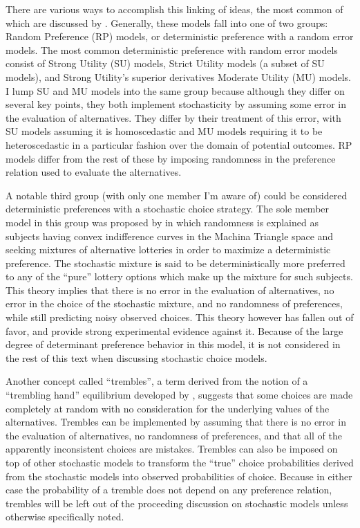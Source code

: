 \documentclass[../main.tex]{subfiles}
\begin{document}
There are various ways to accomplish this linking of ideas, the most common of which are discussed by \textcite{Wilcox2008}.
Generally, these models fall into one of two groups: Random Preference (RP) models, or deterministic preference with a random error models.
The most common deterministic preference with random error models consist of Strong Utility (SU) models, Strict Utility models (a subset of SU models), and Strong Utility's superior derivatives Moderate Utility (MU) models.
I lump SU and MU models into the same group because although they differ on several key points, they both implement stochasticity by assuming some error in the evaluation of alternatives.
They differ by their treatment of this error, with SU models assuming it is homoscedastic and MU models requiring it to be heteroscedastic in a particular fashion over the domain of potential outcomes.
RP models differ from the rest of these by imposing randomness in the preference relation used to evaluate the alternatives.

A notable third group (with only one member I'm aware of) could be considered deterministic preferences with a stochastic choice strategy.
The sole member model in this group was proposed by \textcite{Machina1985} in which randomness is explained as subjects having convex indifference curves in the Machina Triangle space \textcite{Machina1987} and seeking mixtures of alternative lotteries in order to maximize a deterministic preference.
The stochastic mixture is said to be deterministically more preferred to any of the \enquote{pure} lottery options which make up the mixture for such subjects.
This theory implies that there is no error in the evaluation of alternatives, no error in the choice of the stochastic mixture, and no randomness of preferences, while still predicting noisy observed choices.
This theory however has fallen out of favor, and \textcite{Hey1995} provide strong experimental evidence against it.
Because of the large degree of determinant preference behavior in this model, it is not considered in the rest of this text when discussing stochastic choice models.

Another concept called \enquote{trembles}, a term derived from the notion of a \enquote{trembling hand} equilibrium developed by \textcite{Selten1975}, suggests that some choices are made completely at random with no consideration for the underlying values of the alternatives.
Trembles can be implemented by assuming that there is no error in the evaluation of alternatives, no randomness of preferences, and that all of the apparently inconsistent choices are mistakes.
Trembles can also be imposed on top of other stochastic models to transform the \enquote{true} choice probabilities derived from the stochastic models into observed probabilities of choice.
Because in either case the probability of a tremble does not depend on any preference relation, trembles will be left out of the proceeding discussion on stochastic models unless otherwise specifically noted.
\end{document}
